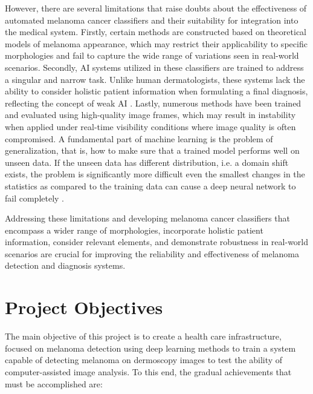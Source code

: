 However, there are several limitations that raise doubts about the
effectiveness of automated melanoma cancer classifiers and their suitability
for integration into the medical system. Firstly, certain methods are
constructed based on theoretical models of melanoma appearance, which may
restrict their applicability to specific morphologies and fail to capture the
wide range of variations seen in real-world scenarios. Secondly, AI systems
utilized in these classifiers are trained to address a singular and narrow
task. Unlike human dermatologists, these systems lack the ability to consider
holistic patient information when formulating a final diagnosis, reflecting the
concept of weak AI \cite{WeakAI}. Lastly, numerous methods have been trained
and evaluated using high-quality image frames, which may result in instability
when applied under real-time visibility conditions where image quality is often
compromised. A fundamental part of machine learning is the problem of
generalization, that is, how to make sure that a trained model performs well on
unseen data. If the unseen data has different distribution, i.e. a domain shift
exists, the problem is significantly more difficult even the smallest changes
in the statistics as compared to the training data can cause a deep neural
network to fail completely \cite{DomainShift}. \newline

Addressing these limitations and developing melanoma cancer classifiers that
encompass a wider range of morphologies, incorporate holistic patient
information, consider relevant elements, and demonstrate robustness in
real-world scenarios are crucial for improving the reliability and
effectiveness of melanoma detection and diagnosis systems. \newline

\section{Project Objectives}

The main objective of this project is to create a health care infrastructure,
focused on melanoma detection using deep learning methods to train a system
capable of detecting melanoma on dermoscopy images to test the ability of
computer-assisted image analysis. To this end, the gradual achievements that
must be accomplished are:


